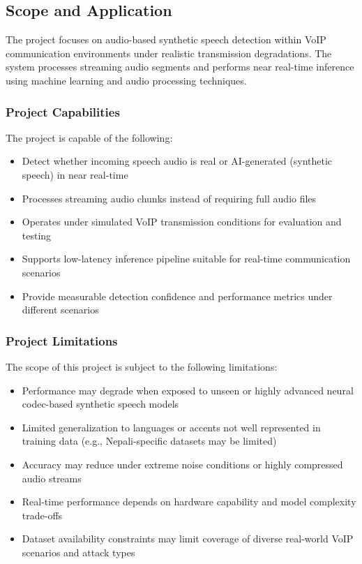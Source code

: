 \subsection{Scope and Application}

The project focuses on audio-based synthetic speech detection within VoIP communication environments under realistic transmission degradations. The system processes streaming audio segments and performs near real-time inference using machine learning and audio processing techniques.

\subsubsection{Project Capabilities}

The project is capable of the following:
\begin{itemize}
    \item Detect whether incoming speech audio is real or AI-generated (synthetic speech) in near real-time
    \item Processes streaming audio chunks instead of requiring full audio files
    \item Operates under simulated VoIP transmission conditions for evaluation and testing
    \item Supports low-latency inference pipeline suitable for real-time communication scenarios
    \item Provide measurable detection confidence and performance metrics under different scenarios
\end{itemize}


\subsubsection{Project Limitations}

The scope of this project is subject to the following limitations:
\begin{itemize}
    \item Performance may degrade when exposed to unseen or highly advanced neural codec-based synthetic speech models
    \item Limited generalization to languages or accents not well represented in training data (e.g., Nepali-specific datasets may be limited)
    \item Accuracy may reduce under extreme noise conditions or highly compressed audio streams
    \item Real-time performance depends on hardware capability and model complexity trade-offs
    \item Dataset availability constraints may limit coverage of diverse real-world VoIP scenarios and attack types
\end{itemize}


